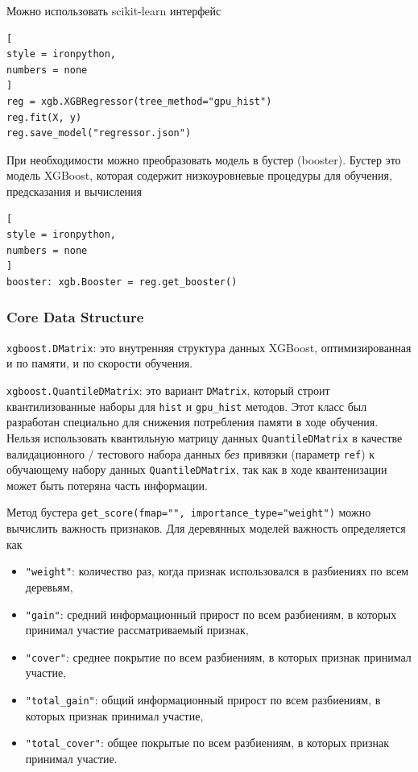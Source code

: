 \documentclass[%
	11pt,
	a4paper,
	utf8,
		]{article}
\begin{document}
Можно использовать scikit-learn интерфейс
\begin{lstlisting}[
style = ironpython,
numbers = none
]
reg = xgb.XGBRegressor(tree_method="gpu_hist")
reg.fit(X, y)
reg.save_model("regressor.json")
\end{lstlisting}

При необходимости можно преобразовать модель в бустер (booster). Бустер это модель XGBoost, которая содержит низкоуровневые процедуры для обучения, предсказания и вычисления
\begin{lstlisting}[
style = ironpython,
numbers = none
]
booster: xgb.Booster = reg.get_booster()
\end{lstlisting}

\subsubsection{Core Data Structure}

\verb|xgboost.DMatrix|: это внутренняя структура данных XGBoost, оптимизированная и по памяти, и по скорости обучения.

\verb|xgboost.QuantileDMatrix|: это вариант \verb|DMatrix|, который строит квантилизованные наборы для \verb|hist| и \verb|gpu_hist| методов. Этот класс был разработан специально для снижения потребления памяти в ходе обучения. Нельзя использовать квантильную матрицу данных \verb|QuantileDMatrix| в качестве валидационного / тестового набора данных \emph{без} привязки (параметр \verb|ref|) к обучающему набору данных \verb|QuantileDMatrix|, так как в ходе квантенизации может быть потеряна часть информации.

Метод бустера \verb|get_score(fmap="", importance_type="weight")| можно вычислить важность признаков. Для деревянных моделей важность определяется как
\begin{itemize}
	\item \verb|"weight"|: количество раз, когда признак использовался в разбиениях по всем деревьям,
	
	\item \verb|"gain"|: средний информационный прирост по всем разбиениям, в которых принимал участие рассматриваемый признак,
	
	\item \verb|"cover"|: среднее покрытие по всем разбиениям, в которых признак принимал участие,
	
	\item \verb|"total_gain"|: общий информационный прирост по всем разбиениям, в которых признак принимал участие,
	
	\item \verb|"total_cover"|: общее покрытые по всем разбиениям, в которых признак принимал участие.
\end{itemize} 
\end{document}
